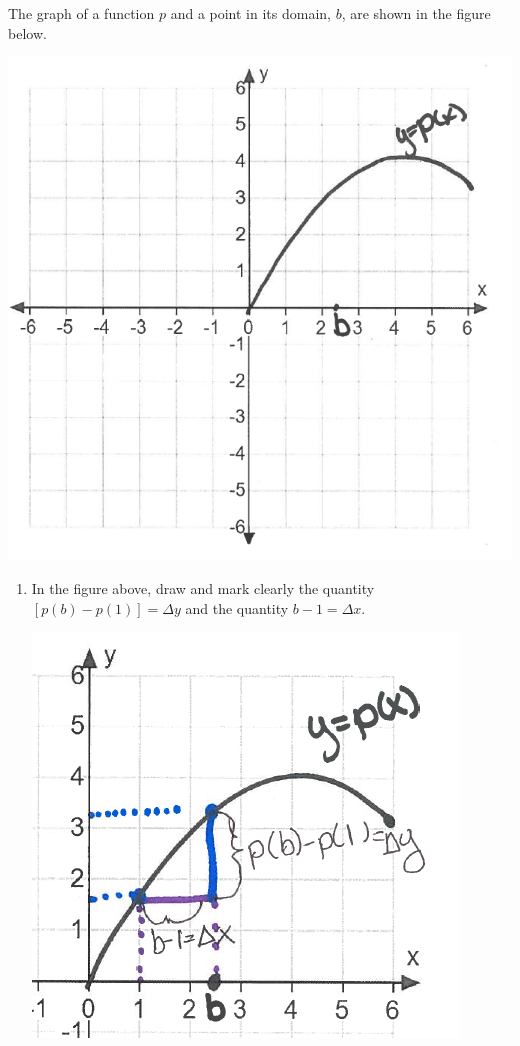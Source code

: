\documentclass[nooutcomes]{ximera}
\begin{document}
\begin{problem}

The graph of a function $p$ and a point in its domain, $b$, are shown in the figure below.
	        \begin{image}
          \includegraphics[scale = 0.5]{Figure6.png}
        \end{image}

	\begin{enumerate}
		\item In the figure above, draw and mark clearly the quantity $[p(b)-p(1)]=\Delta y$ and the quantity $b-1=\Delta x$.
		\begin{freeResponse}\hfil
	        \begin{image}
          \includegraphics[scale = 0.7]{Figure7.png}
        \end{image}


\end{freeResponse}
\end{enumerate}
\end{problem}
\end{document}
